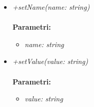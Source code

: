 \begin{itemize}
\begin{itemize}
\begin{itemize}
    		\end{itemize}
    		\item \emph{+setName(name: string)}\\
    		\\
    		\textbf{Parametri:}
    		\begin{itemize}
    			\item \emph{name: string}\\
    			
    		\end{itemize}
    		\item \emph{+setValue(value: string)}\\
    		\\
    		\textbf{Parametri:}
    		\begin{itemize}
    			\item \emph{value: string}\\
    			
    		\end{itemize}
    	\end{itemize}
\end{itemize}